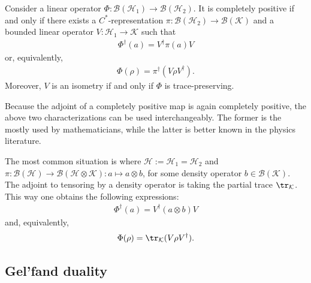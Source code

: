     \begin{theorem}[Stinespring]\label{operators:stinespring}
        Consider a linear operator $\Phi:\mathcal{B}(\mathcal{H}_1)\rightarrow\mathcal{B}(\mathcal{H}_2)$. It is completely positive if and only if there exists a $C^*$-representation $\pi:\mathcal{B}(\mathcal{H}_2)\rightarrow\mathcal{B}(\mathcal{K})$ and a bounded linear operator $V:\mathcal{H}_1\rightarrow\mathcal{K}$ such that
        \begin{gather}
            \Phi^\dagger(a) = V^\dag\pi(a)V
        \end{gather}
        or, equivalently,
        \begin{gather}
            \Phi(\rho) = \pi^\dagger(V\rho V^\dagger).
        \end{gather}
        Moreover, $V$ is an isometry if and only if $\Phi$ is trace-preserving.
    \end{theorem}
    \begin{remark}
        Because the adjoint of a completely positive map is again completely positive, the above two characterizations can be used interchangeably. The former is the mostly used by mathematicians, while the latter is better known in the physics literature.

        The most common situation is where $\mathcal{H}:=\mathcal{H}_1=\mathcal{H}_2$ and $\pi:\mathcal{B}(\mathcal{H})\rightarrow\mathcal{B}(\mathcal{H}\otimes\mathcal{K}):a\mapsto a\otimes b$, for some density operator $b\in\mathcal{B}(\mathcal{K})$. The adjoint to tensoring by a density operator is taking the partial trace $\tr_\mathcal{K}$. This way one obtains the following expressions:
        \begin{gather}
            \Phi^\dagger(a) = V^\dag(a\otimes b)V
        \end{gather}
        and, equivalently,
        \begin{gather}
            \Phi(\rho) = \tr_\mathcal{K}(V\rho V^\dagger).
        \end{gather}
    \end{remark}

\subsection{Gel'fand duality}

